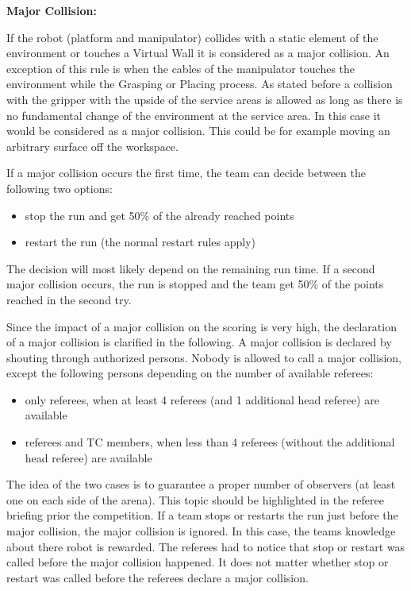 \textbf{Major Collision:}

If the robot (platform and manipulator) collides with a static element of the environment or touches a Virtual Wall it is considered as a major collision. An exception of this rule is when the cables of the manipulator touches the environment while the Grasping or Placing process. As stated before a collision with the  gripper with the upside of the service areas is allowed as long as there is no fundamental change of the environment at the service area. In this case it would be considered as a major collision. This could be for example moving an arbitrary surface off the workspace. 

If a major collision occurs the first time, the team can decide between the following two options:
\begin{itemize}
	\item stop the run and get 50\% of the already reached points
	\item restart the run (the normal restart rules apply)
\end{itemize}
The decision will most likely depend on the remaining run time. If a second major collision occurs, the run is stopped and the team get 50\% of the points reached in the second try.


Since the impact of a major collision on the scoring is very high, the declaration of a major collision is clarified in the following. A major collision is declared by shouting through authorized persons. Nobody is allowed to call a major collision, except the following persons depending on the number of available referees:
\begin{itemize}
	\item only referees, when at least 4 referees (and 1 additional head referee) are available
	\item referees and TC members, when less than 4 referees (without the additional head referee) are available
\end{itemize}
The idea of the two cases is to guarantee a proper number of observers (at least one on each side of the arena). This topic should be highlighted in the referee briefing prior the competition. If a team stops or restarts the run just before the major collision, the major collision is ignored. In this case, the teams knowledge about there robot is rewarded. The referees had to notice that stop or restart was called before the major collision happened. It does not matter whether stop or restart was called before the referees declare a major collision.


